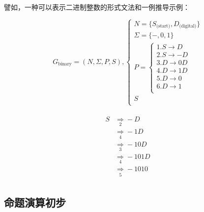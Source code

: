 譬如，一种可以表示二进制整数的形式文法和一例推导示例：
\begin{multicols}{2}
	\[
	G_\text{binary} = (N, \Sigma, P, S), \begin{cases}
	    N      = \{ S_\text{(start)}, D_\text{(digital)} \} \\
	    \Sigma = \{ -, 0, 1 \}                              \\
	    P      = \begin{cases}
	                 \text{1.} S \to D  \\
	                 \text{2.} S \to -D \\
	                 \text{3.} D \to 0D \\
	                 \text{4.} D \to 1D \\
	                 \text{5.} D \to 0  \\
	                 \text{6.} D \to 1  \\
	             \end{cases}                                \\
	    S                                                   \\
	\end{cases}
	\] \\
	\[
	\begin{aligned}
	    S &\underset{2}{\Rightarrow} -D    \\
	      &\underset{4}{\Rightarrow} -1D   \\
	      &\underset{3}{\Rightarrow} -10D  \\
	      &\underset{4}{\Rightarrow} -101D \\
	      &\underset{5}{\Rightarrow} -1010 \\
	\end{aligned}
	\]
\end{multicols}

\subsection{命题演算初步}

